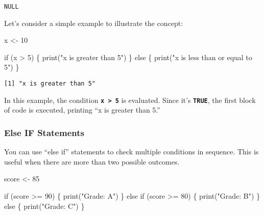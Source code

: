 \documentclass[
  letterpaper,
  DIV=11,
  numbers=noendperiod]{scrartcl}
\newenvironment{Shaded}{\begin{snugshade}}{\end{snugshade}}
\newcommand{\ControlFlowTok}[1]{\textcolor[rgb]{0.00,0.23,0.31}{#1}}
\newcommand{\DecValTok}[1]{\textcolor[rgb]{0.68,0.00,0.00}{#1}}
\newcommand{\FunctionTok}[1]{\textcolor[rgb]{0.28,0.35,0.67}{#1}}
\newcommand{\NormalTok}[1]{\textcolor[rgb]{0.00,0.23,0.31}{#1}}
\newcommand{\OtherTok}[1]{\textcolor[rgb]{0.00,0.23,0.31}{#1}}
\newcommand{\SpecialCharTok}[1]{\textcolor[rgb]{0.37,0.37,0.37}{#1}}
\newcommand{\StringTok}[1]{\textcolor[rgb]{0.13,0.47,0.30}{#1}}
\begin{document}
\begin{verbatim}
NULL
\end{verbatim}

Let's consider a simple example to illustrate the concept:

\begin{Shaded}
\begin{Highlighting}[]
\NormalTok{x }\OtherTok{\textless{}{-}} \DecValTok{10}

\ControlFlowTok{if}\NormalTok{ (x }\SpecialCharTok{\textgreater{}} \DecValTok{5}\NormalTok{) \{}
  \FunctionTok{print}\NormalTok{(}\StringTok{"x is greater than 5"}\NormalTok{)}
\NormalTok{\} }\ControlFlowTok{else}\NormalTok{ \{}
  \FunctionTok{print}\NormalTok{(}\StringTok{"x is less than or equal to 5"}\NormalTok{)}
\NormalTok{\}}
\end{Highlighting}
\end{Shaded}

\begin{verbatim}
[1] "x is greater than 5"
\end{verbatim}

In this example, the condition \textbf{\texttt{x\ \textgreater{}\ 5}} is
evaluated. Since it's \textbf{\texttt{TRUE}}, the first block of code is
executed, printing ``x is greater than 5.''

\hypertarget{else-if-statements}{%
\subsubsection{Else IF Statements}\label{else-if-statements}}

You can use ``else if'' statements to check multiple conditions in
sequence. This is useful when there are more than two possible outcomes.

\begin{Shaded}
\begin{Highlighting}[]
\NormalTok{score }\OtherTok{\textless{}{-}} \DecValTok{85}

\ControlFlowTok{if}\NormalTok{ (score }\SpecialCharTok{\textgreater{}=} \DecValTok{90}\NormalTok{) \{}
  \FunctionTok{print}\NormalTok{(}\StringTok{"Grade: A"}\NormalTok{)}
\NormalTok{\} }\ControlFlowTok{else} \ControlFlowTok{if}\NormalTok{ (score }\SpecialCharTok{\textgreater{}=} \DecValTok{80}\NormalTok{) \{}
  \FunctionTok{print}\NormalTok{(}\StringTok{"Grade: B"}\NormalTok{)}
\NormalTok{\} }\ControlFlowTok{else}\NormalTok{ \{}
  \FunctionTok{print}\NormalTok{(}\StringTok{"Grade: C"}\NormalTok{)}
\NormalTok{\}}
\end{Highlighting}
\end{Shaded}
\end{document}
